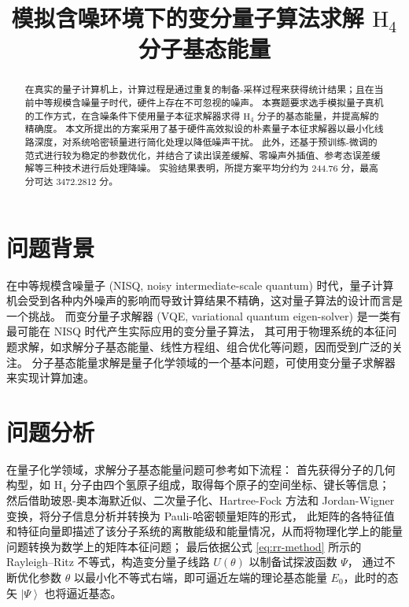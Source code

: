 \documentclass[withoutpreface,bwprint]{cumcmthesis}
\title{模拟含噪环境下的变分量子算法求解 $ \mathrm{H}_4 $ 分子基态能量}
\begin{document}
\maketitle
\begin{abstract}
在真实的量子计算机上，计算过程是通过重复的制备-采样过程来获得统计结果；且在当前中等规模含噪量子时代，硬件上存在不可忽视的噪声。
本赛题要求选手模拟量子真机的工作方式，在含噪条件下使用量子本征求解器求得 $ \mathrm{H}_4 $ 分子的基态能量，并提高解的精确度。
本文所提出的方案采用了基于硬件高效拟设的朴素量子本征求解器以最小化线路深度，对系统哈密顿量进行简化处理以降低噪声干扰。
此外，还基于预训练-微调的范式进行较为稳定的参数优化，并结合了读出误差缓解、零噪声外插值、参考态误差缓解等三种技术进行后处理降噪。
实验结果表明，所提方案平均分约为 244.76 分，最高分可达 3472.2812 分。

\end{abstract}




\section{问题背景}

在中等规模含噪量子 (NISQ, noisy intermediate-scale quantum) 时代，量子计算机会受到各种内外噪声的影响而导致计算结果不精确，这对量子算法的设计而言是一个挑战。
而变分量子求解器 (VQE, variational quantum eigen-solver) 是一类有最可能在 NISQ 时代产生实际应用的变分量子算法，
其可用于物理系统的本征问题求解，如求解分子基态能量、线性方程组、组合优化等问题，因而受到广泛的关注。
分子基态能量求解是量子化学领域的一个基本问题，可使用变分量子求解器来实现计算加速。


\section{问题分析}

在量子化学领域，求解分子基态能量问题可参考如下流程：
首先获得分子的几何构型，如 $ \mathrm{H}_4 $ 分子由四个氢原子组成，取得每个原子的空间坐标、键长等信息；
然后借助玻恩-奧本海默近似、二次量子化、Hartree-Fock 方法和 Jordan-Wigner 变换，将分子信息分析并转换为 Pauli-哈密顿量矩阵的形式，
此矩阵的各特征值和特征向量即描述了该分子系统的离散能级和能量情况，从而将物理化学上的能量问题转换为数学上的矩阵本征问题；
最后依据公式 \ref{eq:rr-method} 所示的 Rayleigh–Ritz 不等式，构造变分量子线路 $ U(\theta) $ 以制备试探波函数 $ \Psi $，
通过不断优化参数 $ \theta $ 以最小化不等式右端，即可逼近左端的理论基态能量 $ E_0 $，此时的态矢 $ \left| \Psi \right> $ 也将逼近基态。
\end{document}
